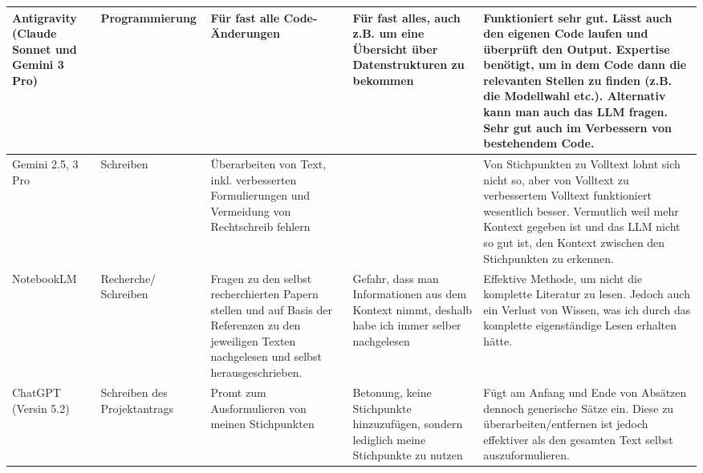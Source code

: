 \documentclass[../main.tex]{subfiles}
\begin{document}
\begin{appendices}
\begin{tiny}
\begin{longtable}{p{}|p{}|p{}|p{}|p{}}
            Antigravity (Claude Sonnet und Gemini 3 Pro) & Programmierung               & Für fast alle Code-Änderungen                                                                                                                      & Für fast alles, auch z.B. um eine Übersicht über Datenstrukturen zu bekommen                                                                         & Funktioniert sehr gut. Lässt auch den eigenen Code laufen und überprüft den Output. Expertise benötigt, um in dem Code dann die relevanten Stellen zu finden (z.B. die Modellwahl etc.). Alternativ kann man auch das LLM fragen. Sehr gut auch im Verbessern von bestehendem Code. \\ \hline

            Gemini 2.5, 3 Pro                            & Schreiben                    & Überarbeiten von Text, inkl. verbesserten Formulierungen und Vermeidung von Rechtschreib fehlern                                                   &                                                                                                                                                      & Von Stichpunkten zu Volltext lohnt sich nicht so, aber von Volltext zu verbessertem Volltext funktioniert wesentlich besser. Vermutlich weil mehr Kontext gegeben ist und das LLM nicht so gut ist, den Kontext zwischen den Stichpunkten zu erkennen.                              \\ \hline
            NotebookLM                                   & Recherche/ Schreiben         & Fragen zu den selbst recherchierten Papern stellen und auf Basis der Referenzen zu den jeweiligen Texten nachgelesen und selbst herausgeschrieben. & Gefahr, dass man Informationen aus dem Kontext nimmt, deshalb habe ich immer selber nachgelesen                                                      & Effektive Methode, um nicht die komplette Literatur zu lesen. Jedoch auch ein Verlust von Wissen, was ich durch das komplette eigenständige Lesen erhalten hätte.                                                                                                                   \\ \hline
            ChatGPT (Versin 5.2)                         & Schreiben des Projektantrags & Promt zum Ausformulieren von meinen Stichpunkten                                                                                                   & Betonung, keine Stichpunkte hinzuzufügen, sondern lediglich meine Stichpunkte zu nutzen                                                              & Fügt am Anfang und Ende von Absätzen dennoch generische Sätze ein. Diese zu überarbeiten/entfernen ist jedoch effektiver als den gesamten Text selbst auszuformulieren.                                                                                                             \\ \hline

\end{longtable}
\end{tiny}
\end{appendices}
\end{document}
